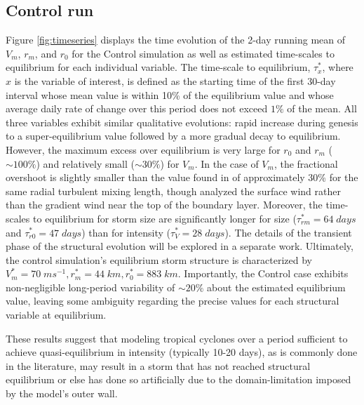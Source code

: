 \documentclass[12pt]{article}
\begin{document}
\subsection{Control run}
Figure \ref{fig:timeseries} displays the time evolution of the 2-day running mean of $V_m$, $r_m$, and $r_0$ for the Control simulation as well as estimated time-scales to equilibrium for each individual variable.  The time-scale to equilibrium, $\tau^*_x$, where $x$ is the variable of interest, is defined as the starting time of the first 30-day interval whose mean value is within 10\% of the equilibrium value and whose average daily rate of change over this period does not exceed $1\%$ of the mean.  All three variables exhibit similar qualitative evolutions: rapid increase during genesis to a super-equilibrium value followed by a more gradual decay to equilibrium.  However, the maximum excess over equilibrium is very large for $r_0$ and $r_m$ ($\sim 100\%$) and relatively small ($\sim 30\%$) for $V_m$. In the case of $V_m$, the fractional overshoot is slightly smaller than the value found in \cite{Hakim_2011} of approximately 30\% for the same radial turbulent mixing length, though \cite{Hakim_2011} analyzed the surface wind rather than the gradient wind near the top of the boundary layer.  Moreover, the time-scales to equilibrium for storm size are significantly longer for size ($\tau^*_{rm} = 64 \; days$ and $\tau^*_{r0} = 47 \; days$) than for intensity ($\tau^*_V = 28 \; days$).  The details of the transient phase of the structural evolution will be explored in a separate work.  Ultimately, the control simulation's equilibrium storm structure is characterized by $V^*_m = 70 \; ms^{-1}, r^*_m = 44 \; km, r^*_0 = 883 \; km$.  Importantly, the Control case exhibits non-negligible long-period variability of $\sim20\%$ about the estimated equilibrium value, leaving some ambiguity regarding the precise values for each structural variable at equilibrium.

These results suggest that modeling tropical cyclones over a period sufficient to achieve quasi-equilibrium in intensity (typically 10-20 days), as is commonly done in the literature, may result in a storm that has not reached structural equilibrium or else has done so artificially due to the domain-limitation imposed by the model's outer wall.

\end{document}
